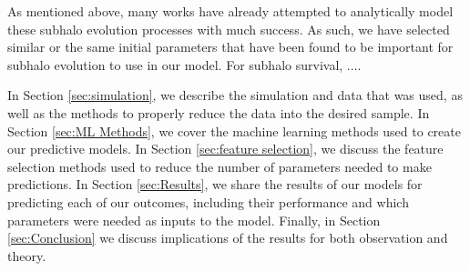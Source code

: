 \documentclass[fleqn,usenatbib]{mnras}
\begin{document}
As mentioned above, many works have already attempted to analytically model these subhalo evolution processes with much success. As such, we have selected similar or the same initial parameters that have been found to be important for subhalo evolution to use in our model. For subhalo survival, ....

In Section \ref{sec:simulation}, we describe the simulation and data that was used, as well as the methods to properly reduce the data into the desired sample. In Section \ref{sec:ML Methods}, we cover the machine learning methods used to create our predictive models. In Section \ref{sec:feature selection}, we discuss the feature selection methods used to reduce the number of parameters needed to make predictions. In Section \ref{sec:Results}, we share the results of our models for predicting each of our outcomes, including their performance and which parameters were needed as inputs to the model. Finally, in Section \ref{sec:Conclusion} we discuss implications of the results for both observation and theory.
\end{document}
